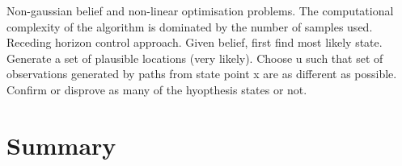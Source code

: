 \cite{non_gauss_bel_plan_2012} Non-gaussian belief and non-linear optimisation problems. The computational complexity
of the algorithm is dominated by the number of samples used. Receding horizon control approach. Given belief, first 
find most likely state. Generate a set of plausible locations (very likely). Choose u such that set of observations 
generated by paths from state point x are as different as possible. Confirm or disprove as many of the hyopthesis states 
or not.









 
\cite{u_aware_grasp_ICRA_2015}
\cite{Li_2015}


\cite{un_water_inspection_icra_2012}
\cite{Bayesian_explor_exploit_2009}
\cite{Macro_uncertainty_2011}


\section{Summary}




